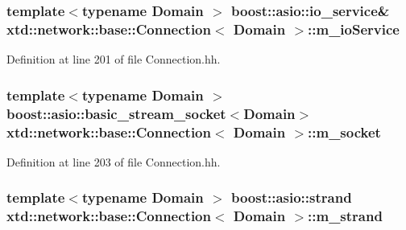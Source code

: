 \hypertarget{classxtd_1_1network_1_1base_1_1Connection_aee549e0f84206cc897371ec3ba2cba49}{
\subsubsection[{m\-\_\-io\-Service}]{\setlength{\rightskip}{0pt plus 5cm}template$<$typename Domain $>$ boost\-::asio\-::io\-\_\-service\& {\bf xtd\-::network\-::base\-::\-Connection}$<$ Domain $>$\-::m\-\_\-io\-Service\hspace{0.3cm}{\ttfamily [protected]}}}\label{classxtd_1_1network_1_1base_1_1Connection_aee549e0f84206cc897371ec3ba2cba49}


Definition at line 201 of file Connection.\-hh.

\hypertarget{classxtd_1_1network_1_1base_1_1Connection_af054fe7efb3d4f8a1a0f40c0e74e8c70}{
\subsubsection[{m\-\_\-socket}]{\setlength{\rightskip}{0pt plus 5cm}template$<$typename Domain $>$ boost\-::asio\-::basic\-\_\-stream\-\_\-socket$<$Domain$>$ {\bf xtd\-::network\-::base\-::\-Connection}$<$ Domain $>$\-::m\-\_\-socket\hspace{0.3cm}{\ttfamily [protected]}}}\label{classxtd_1_1network_1_1base_1_1Connection_af054fe7efb3d4f8a1a0f40c0e74e8c70}


Definition at line 203 of file Connection.\-hh.

\hypertarget{classxtd_1_1network_1_1base_1_1Connection_afdbd7eaed6dc0b71b05a6ef3be2f417d}{
\subsubsection[{m\-\_\-strand}]{\setlength{\rightskip}{0pt plus 5cm}template$<$typename Domain $>$ boost\-::asio\-::strand {\bf xtd\-::network\-::base\-::\-Connection}$<$ Domain $>$\-::m\-\_\-strand\hspace{0.3cm}{\ttfamily [protected]}}}\label{classxtd_1_1network_1_1base_1_1Connection_afdbd7eaed6dc0b71b05a6ef3be2f417d}


